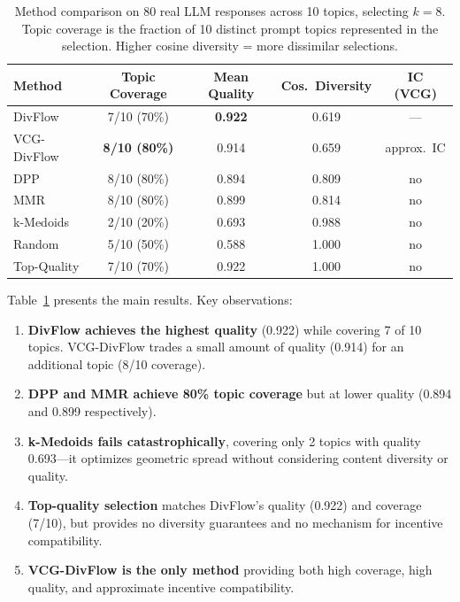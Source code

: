 \documentclass[10pt]{article}
\begin{document}
\begin{table}[t]
\centering
\caption{Method comparison on 80 real LLM responses across 10 topics, selecting $k=8$. Topic coverage is the fraction of 10 distinct prompt topics represented in the selection. Higher cosine diversity = more dissimilar selections.}
\label{tab:main}
\begin{tabular}{lcccc}
\toprule
\textbf{Method} & \textbf{Topic Coverage} & \textbf{Mean Quality} & \textbf{Cos.\ Diversity} & \textbf{IC (VCG)} \\
\midrule
DivFlow       & 7/10 (70\%) & \textbf{0.922} & 0.619 & --- \\
VCG-DivFlow   & \textbf{8/10 (80\%)} & 0.914 & 0.659 & approx.\ IC \\
DPP           & 8/10 (80\%) & 0.894 & 0.809 & no \\
MMR           & 8/10 (80\%) & 0.899 & 0.814 & no \\
k-Medoids     & 2/10 (20\%) & 0.693 & 0.988 & no \\
Random        & 5/10 (50\%) & 0.588 & 1.000 & no \\
Top-Quality   & 7/10 (70\%) & 0.922 & 1.000 & no \\
\bottomrule
\end{tabular}
\end{table}

Table~\ref{tab:main} presents the main results.
Key observations:

\begin{enumerate}[leftmargin=*,itemsep=2pt]
  \item \textbf{DivFlow achieves the highest quality} (0.922) while covering 7 of 10 topics.
  VCG-DivFlow trades a small amount of quality (0.914) for an additional topic (8/10 coverage).
  \item \textbf{DPP and MMR achieve 80\% topic coverage} but at lower quality (0.894 and 0.899 respectively).
  \item \textbf{k-Medoids fails catastrophically}, covering only 2 topics with quality 0.693---it optimizes geometric spread without considering content diversity or quality.
  \item \textbf{Top-quality selection} matches DivFlow's quality (0.922) and coverage (7/10), but provides no diversity guarantees and no mechanism for incentive compatibility.
  \item \textbf{VCG-DivFlow is the only method} providing both high coverage, high quality, and approximate incentive compatibility.
\end{enumerate}
\end{document}
